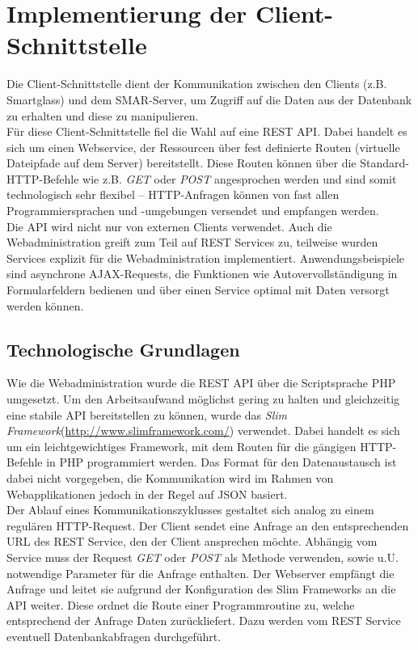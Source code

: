 \chapter{Implementierung der Client-Schnittstelle}
\label{cha:impl_api}

Die Client-Schnittstelle dient der Kommunikation zwischen den Clients (z.B. Smartglass) und dem \acs{SMAR}-Server, um Zugriff auf die Daten aus der Datenbank zu erhalten und diese zu manipulieren.\\

Für diese Client-Schnittstelle fiel die Wahl auf eine \acs{REST} \acs{API}. Dabei handelt es sich um einen Webservice, der Ressourcen über fest definierte Routen (virtuelle Dateipfade auf dem Server) bereitstellt. Diese Routen können über die Standard-\acs{HTTP}-Befehle wie z.B. \emph{GET} oder \emph{POST} angesprochen werden und sind somit technologisch sehr flexibel -- \acs{HTTP}-Anfragen können von fast allen Programmiersprachen und -umgebungen versendet und empfangen werden.\\

Die \acs{API} wird nicht nur von externen Clients verwendet. Auch die Webadministration greift zum Teil auf \acs{REST} Services zu, teilweise wurden Services explizit für die Webadministration implementiert. Anwendungsbeispiele sind asynchrone \acs{AJAX}-Requests, die Funktionen wie Autovervollständigung in Formularfeldern bedienen und über einen Service optimal mit Daten versorgt werden können.

\section{Technologische Grundlagen}
Wie die Webadministration wurde die \acs{REST} \acs{API} über die Scriptsprache \acs{PHP} umgesetzt. Um den Arbeitsaufwand möglichst gering zu halten und gleichzeitig eine stabile API bereitstellen zu können, wurde das \emph{Slim Framework}(\url{http://www.slimframework.com/}) verwendet. Dabei handelt es sich um ein leichtgewichtiges Framework, mit dem Routen für die gängigen \acs{HTTP}-Befehle in \acs{PHP} programmiert werden. Das Format für den Datenaustausch ist dabei nicht vorgegeben, die Kommunikation wird im Rahmen von Webapplikationen jedoch in der Regel auf JSON basiert.\\

Der Ablauf eines Kommunikationszyklusses gestaltet sich analog zu einem regulären \acs{HTTP}-Request. Der Client sendet eine Anfrage an den entsprechenden \acs{URL} des \acs{REST} Service, den der Client ansprechen möchte. Abhängig vom Service muss der Request \emph{GET} oder \emph{POST} als Methode verwenden, sowie u.U. notwendige Parameter für die Anfrage enthalten. Der Webserver empfängt die Anfrage und leitet sie aufgrund der Konfiguration des Slim Frameworks an die \acs{API} weiter. Diese ordnet die Route einer Programmroutine zu, welche entsprechend der Anfrage Daten zurückliefert. Dazu werden vom REST Service eventuell Datenbankabfragen durchgeführt.\\


